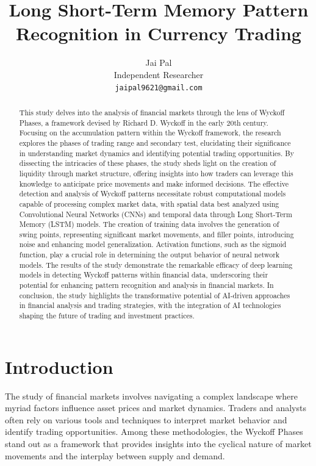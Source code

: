 \documentclass{article}
\title{Long Short-Term Memory Pattern Recognition in Currency Trading}
\author{
  Jai Pal \\
  Independent Researcher \\
  \texttt{jaipal9621@gmail.com}
}
\begin{document}
\maketitle

\begin{abstract}
This study delves into the analysis of financial markets through the lens of Wyckoff Phases, a framework devised by Richard D. Wyckoff in the early 20th century. Focusing on the accumulation pattern within the Wyckoff framework, the research explores the phases of trading range and secondary test, elucidating their significance in understanding market dynamics and identifying potential trading opportunities. By dissecting the intricacies of these phases, the study sheds light on the creation of liquidity through market structure, offering insights into how traders can leverage this knowledge to anticipate price movements and make informed decisions. The effective detection and analysis of Wyckoff patterns necessitate robust computational models capable of processing complex market data, with spatial data best analyzed using Convolutional Neural Networks (CNNs) and temporal data through Long Short-Term Memory (LSTM) models. The creation of training data involves the generation of swing points, representing significant market movements, and filler points, introducing noise and enhancing model generalization. Activation functions, such as the sigmoid function, play a crucial role in determining the output behavior of neural network models. The results of the study demonstrate the remarkable efficacy of deep learning models in detecting Wyckoff patterns within financial data, underscoring their potential for enhancing pattern recognition and analysis in financial markets. In conclusion, the study highlights the transformative potential of AI-driven approaches in financial analysis and trading strategies, with the integration of AI technologies shaping the future of trading and investment practices.
\end{abstract}




\section{Introduction}
The study of financial markets involves navigating a complex landscape where myriad factors influence asset prices and market dynamics. Traders and analysts often rely on various tools and techniques to interpret market behavior and identify trading opportunities. Among these methodologies, the Wyckoff Phases stand out as a framework that provides insights into the cyclical nature of market movements and the interplay between supply and demand.
\end{document}
